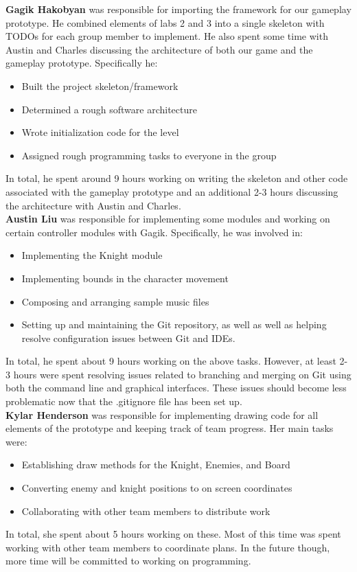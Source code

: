 \documentclass[]{article}
\begin{document}
\textbf{Gagik Hakobyan} 
was responsible for importing the framework for our gameplay
prototype. He combined elements of labs 2 and 3 into a single skeleton
with TODOs for each group member to implement. He also spent some time
with Austin and Charles discussing the architecture of both our game
and the gameplay prototype. Specifically he:
\begin{itemize}
\item Built the project skeleton/framework
\item Determined a rough software architecture
\item Wrote initialization code for the level
\item Assigned rough programming tasks to everyone in the group
\end{itemize}
In total, he spent around 9 hours working on writing the skeleton and
other code associated with the gameplay prototype and an additional
2-3 hours discussing the architecture with Austin and Charles.\\

\textbf{Austin Liu} 
was responsible for implementing some modules and working on 
certain controller modules with Gagik. Specifically, he was involved in:
\begin{itemize}
\item Implementing the Knight module
\item Implementing bounds in the character movement
\item Composing and arranging sample music files 
\item Setting up and maintaining the Git repository, as well as well 
  as helping resolve configuration issues between Git and IDEs. 
\end{itemize}
In total, he spent about 9 hours working on the above tasks. However,
at least 2-3 hours were spent resolving issues related to branching
and merging on Git using both the command line and graphical
interfaces. These issues should become less problematic now that the
.gitignore file has been set up.\\

\textbf{Kylar Henderson} 
was responsible for implementing drawing code for all 
elements of the prototype and keeping track of team progress. 
Her main tasks were:
\begin{itemize}
\item Establishing draw methods for the Knight, Enemies, and Board
\item Converting enemy and knight positions to on screen coordinates
\item Collaborating with other team members to distribute work 
\end{itemize}
In total, she spent about 5 hours working on these. Most of this time
was spent working with other team members to coordinate plans. In the
future though, more time will be committed to working on programming.\\
\end{document}
